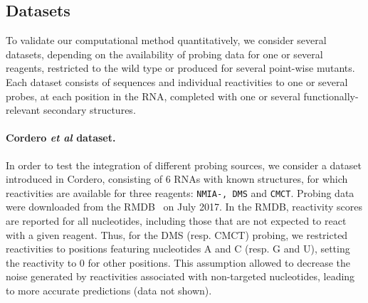 \documentclass[a4,center,fleqn]{NAR}
\begin{document}



\subsection*{Datasets} 
\label{sec:datasets}
To validate our computational method quantitatively, we consider several datasets, depending on the availability of probing data for one or several reagents, restricted to the wild type or produced for several point-wise mutants. Each dataset consists of sequences and individual reactivities to one or several probes, at each position in the RNA, completed with one or several functionally-relevant secondary structures.


\paragraph{Cordero \emph{et al} dataset.} 
In order to test the integration of different probing sources, we consider a dataset introduced in Cordero\etal\cite{Cordero2012}, consisting of $6$ RNAs with known structures, for which reactivities are available for three reagents: {\tt NMIA-\SH, DMS} and {\tt CMCT}. 
Probing data were downloaded from the RMDB~\citep{Cordero2012a} on July 2017. In the RMDB, reactivity scores are reported for all nucleotides, including those that are not expected to react with a given reagent. Thus, for the DMS (resp. CMCT) probing, we restricted reactivities to positions featuring nucleotides {\sf A} and {\sf C} (resp. {\sf G} and {\sf U}), setting the reactivity to 0 for other positions. This assumption allowed to decrease the noise generated by reactivities associated with non-targeted nucleotides, leading to more accurate predictions (data not shown). 
\end{document}
